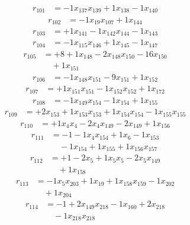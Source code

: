 \[\begin{aligned}
r_{101} &= - 1 x_{137} x_{139} + 1 x_{138} - 1 x_{140}
\end{aligned}\]
\[\begin{aligned}
r_{102} &= - 1 x_{19} x_{107} + 1 x_{144}
\end{aligned}\]
\[\begin{aligned}
r_{103} &= + 1 x_{141} - 1 x_{142} x_{144} - 1 x_{143}
\end{aligned}\]
\[\begin{aligned}
r_{104} &= - 1 x_{115} x_{146} + 1 x_{145} - 1 x_{147}
\end{aligned}\]
\[\begin{aligned}
r_{105} &= + 8 + 1 x_{148} - 2 x_{148} x_{150} - 16 x_{150} \\
 &\quad + 1 x_{151}
\end{aligned}\]
\[\begin{aligned}
r_{106} &= - 1 x_{148} x_{151} - 9 x_{151} + 1 x_{152}
\end{aligned}\]
\[\begin{aligned}
r_{107} &= + 1 x_{151} x_{151} - 1 x_{152} x_{152} + 1 x_{172}
\end{aligned}\]
\[\begin{aligned}
r_{108} &= - 1 x_{149} x_{154} - 1 x_{154} + 1 x_{155}
\end{aligned}\]
\[\begin{aligned}
r_{109} &= + 2 x_{153} + 1 x_{153} x_{153} + 1 x_{154} x_{154} - 1 x_{155} x_{155}
\end{aligned}\]
\[\begin{aligned}
r_{110} &= + 1 x_{4} x_{4} - 2 x_{4} x_{149} - 2 x_{149} + 1 x_{156}
\end{aligned}\]
\[\begin{aligned}
r_{111} &= - 1 - 1 x_{4} x_{154} + 1 x_{6} - 1 x_{153} \\
 &\quad - 1 x_{154} + 1 x_{155} + 1 x_{156} x_{157}
\end{aligned}\]
\[\begin{aligned}
r_{112} &= + 1 - 2 x_{5} + 1 x_{5} x_{5} - 2 x_{5} x_{149} \\
 &\quad + 1 x_{158}
\end{aligned}\]
\[\begin{aligned}
r_{113} &= - 1 x_{5} x_{203} + 1 x_{19} + 1 x_{158} x_{159} - 1 x_{202} \\
 &\quad + 1 x_{204}
\end{aligned}\]
\[\begin{aligned}
r_{114} &= - 1 + 2 x_{149} x_{218} - 1 x_{160} + 2 x_{218} \\
 &\quad - 1 x_{218} x_{218}
\end{aligned}\]
